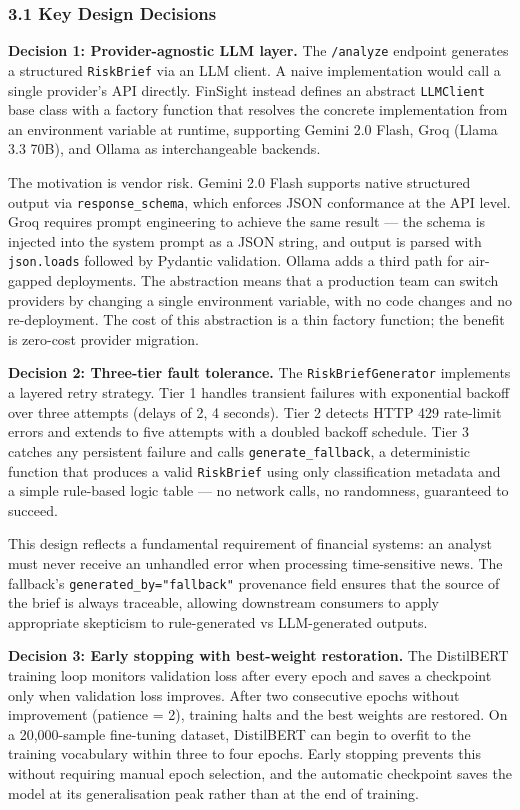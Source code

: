\documentclass[11pt,a4paper]{article}
\begin{document}
\subsubsection*{3.1 Key Design Decisions}

\textbf{Decision 1: Provider-agnostic LLM layer.}
The \texttt{/analyze} endpoint generates a structured \texttt{RiskBrief} via an LLM client. A naive implementation would call a single provider's API directly. FinSight instead defines an abstract \texttt{LLMClient} base class with a factory function that resolves the concrete implementation from an environment variable at runtime, supporting Gemini 2.0 Flash, Groq (Llama 3.3 70B), and Ollama as interchangeable backends.

The motivation is vendor risk. Gemini 2.0 Flash supports native structured output via \texttt{response\_schema}, which enforces JSON conformance at the API level. Groq requires prompt engineering to achieve the same result — the schema is injected into the system prompt as a JSON string, and output is parsed with \texttt{json.loads} followed by Pydantic validation. Ollama adds a third path for air-gapped deployments. The abstraction means that a production team can switch providers by changing a single environment variable, with no code changes and no re-deployment. The cost of this abstraction is a thin factory function; the benefit is zero-cost provider migration.

\textbf{Decision 2: Three-tier fault tolerance.}
The \texttt{RiskBriefGenerator} implements a layered retry strategy. Tier 1 handles transient failures with exponential backoff over three attempts (delays of 2, 4 seconds). Tier 2 detects HTTP 429 rate-limit errors and extends to five attempts with a doubled backoff schedule. Tier 3 catches any persistent failure and calls \texttt{generate\_fallback}, a deterministic function that produces a valid \texttt{RiskBrief} using only classification metadata and a simple rule-based logic table — no network calls, no randomness, guaranteed to succeed.

This design reflects a fundamental requirement of financial systems: an analyst must never receive an unhandled error when processing time-sensitive news. The fallback's \texttt{generated\_by="fallback"} provenance field ensures that the source of the brief is always traceable, allowing downstream consumers to apply appropriate skepticism to rule-generated vs LLM-generated outputs.

\textbf{Decision 3: Early stopping with best-weight restoration.}
The DistilBERT training loop monitors validation loss after every epoch and saves a checkpoint only when validation loss improves. After two consecutive epochs without improvement (patience = 2), training halts and the best weights are restored. On a 20,000-sample fine-tuning dataset, DistilBERT can begin to overfit to the training vocabulary within three to four epochs. Early stopping prevents this without requiring manual epoch selection, and the automatic checkpoint saves the model at its generalisation peak rather than at the end of training.
\end{document}
